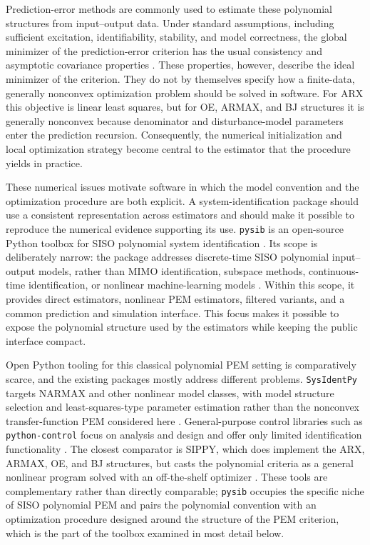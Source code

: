 \documentclass{ifacconf}
\begin{document}
Prediction-error methods are commonly used to estimate these polynomial
structures from input--output data.  Under standard assumptions, including
sufficient excitation, identifiability, stability, and model correctness, the
global minimizer of the prediction-error criterion has the usual consistency and
asymptotic covariance properties \citep{ljung1999,soderstrom1989}.  These
properties, however, describe the ideal minimizer of the criterion.  They do not
by themselves specify how a finite-data, generally nonconvex optimization
problem should be solved in software.  For ARX this objective is linear least
squares, but for OE, ARMAX, and BJ structures it is generally nonconvex because
denominator and disturbance-model parameters enter the prediction recursion.
Consequently, the numerical initialization and local optimization strategy
become central to the estimator that the procedure yields in practice.

These numerical issues motivate software in which the model convention and the
optimization procedure are both explicit.  A system-identification package
should use a consistent representation across estimators and should make it
possible to reproduce the numerical evidence supporting its use.  \texttt{pysib}
is an open-source Python toolbox for SISO polynomial system identification
\citep{pysib2026}.  Its scope is deliberately narrow: the package addresses
discrete-time SISO polynomial input--output models, rather than MIMO
identification, subspace methods, continuous-time identification, or nonlinear
machine-learning models \citep{chen2012}.  Within this scope, it provides direct estimators,
nonlinear PEM estimators, filtered variants, and a common prediction and
simulation interface.  This focus makes it possible to expose the polynomial
structure used by the estimators while keeping the public interface compact.

Open Python tooling for this classical polynomial PEM setting is comparatively
scarce, and the existing packages mostly address different problems.
\texttt{SysIdentPy} targets NARMAX and other nonlinear model classes, with model
structure selection and least-squares-type parameter estimation rather than the
nonconvex transfer-function PEM considered here \citep{sysidentpy}.
General-purpose control libraries such as \texttt{python-control} focus on
analysis and design and offer only limited identification functionality
\citep{pythoncontrol}.  The closest comparator is SIPPY, which does implement the
ARX, ARMAX, OE, and BJ structures, but casts the polynomial criteria as a general
nonlinear program solved with an off-the-shelf optimizer \citep{sippy}.  These
tools are complementary rather than directly comparable; \texttt{pysib} occupies
the specific niche of SISO polynomial PEM and pairs the polynomial convention
with an optimization procedure designed around the structure of the PEM
criterion, which is the part of the toolbox examined in most detail below.
\end{document}
